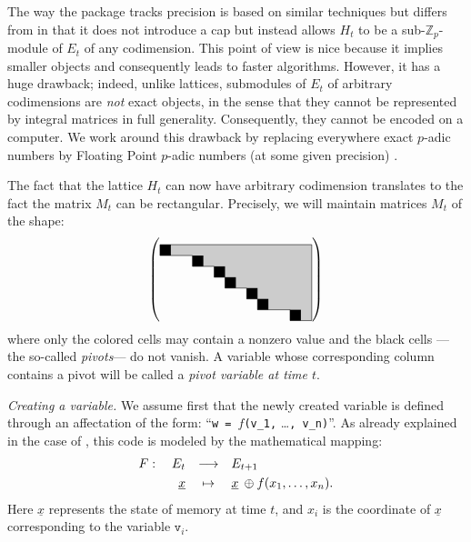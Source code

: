 \documentclass[sigconf]{acmart}
\newcommand{\Z}{\mathbb Z}
\newcommand{\Zp}{\Z_p}
\newcommand{\ttv}{\texttt{v}\xspace}
\newcommand{\ZpLC}{\text{\color{output} \rm \tt ZpLC}\xspace}
\newcommand{\ZpLF}{\text{\color{output} \rm \tt ZpLF}\xspace}
\theoremstyle{definition}
\begin{document}
The way the package \ZpLF tracks precision is based on similar 
techniques but differs from \ZpLC in that it does not introduce a cap 
but instead allows $H_t$ to be a sub-$\Zp$-module of $E_t$ of any 
codimension.
This point of view is nice because it implies smaller objects and 
consequently leads to faster algorithms. However, it has a huge 
drawback; indeed, unlike lattices, submodules of $E_t$ of arbitrary 
codimensions are \emph{not} exact objects, in the sense that they cannot 
be represented by integral matrices in full generality. Consequently,
they cannot be encoded on a computer.
We work around this drawback by replacing everywhere exact $p$-adic 
numbers by Floating Point $p$-adic numbers (at some given precision) 
\cite{}.

The fact that the lattice $H_t$ can now have arbitrary codimension
translates to the fact the matrix $M_t$ can be rectangular.
Precisely, we will maintain matrices $M_t$ of the shape:
\begin{equation}
\label{eq:shapeM-ZpLF}
\left(\raisebox{-0.5\height}{\begin{tikzpicture}[scale=0.3]
\fill[black!20] (0,0)--(0,-1)--(3,-1)--(3,-2)--(5,-2)--(5,-3)
    --(6,-3)--(6,-4)--(8,-4)--(8,-5)--(9,-5)--(9,-6)--(12,-6)
    --(12,-7)--(14,-7)--(14,0)--cycle;
\draw (0,0)--(0,-1)--(3,-1)--(3,-2)--(5,-2)--(5,-3)
    --(6,-3)--(6,-4)--(8,-4)--(8,-5)--(9,-5)--(9,-6)--(12,-6)
    --(12,-7)--(14,-7);
\fill (0,0) rectangle (1,-1);
\fill (3,-1) rectangle (4,-2);
\fill (5,-2) rectangle (6,-3);
\fill (6,-3) rectangle (7,-4);
\fill (8,-4) rectangle (9,-5);
\fill (9,-5) rectangle (10,-6);
\fill (12,-6) rectangle (13,-7);
\draw[thin] (14,-7)--(14,0)--(0,0);
\end{tikzpicture}}\right)
\end{equation}
where only the colored cells may contain a nonzero value and the 
black cells ---the so-called \emph{pivots}--- do not vanish. A
variable whose corresponding column contains a pivot will be called 
a \emph{pivot variable at time $t$}.


\medskip

\noindent \textit{Creating a variable.}
%
We assume first that the newly created variable is defined through an
affectation of the form:
``\verb?w = ?$f$\verb?(v_1,? \ldots\verb?, v_n)?''.
As already explained in the case of \ZpLC, this code is 
modeled by the mathematical mapping:
$$\begin{array}{rcl}
F: \quad E_t & \longrightarrow & E_{t+1} \smallskip \\
\underline x & \mapsto & \underline x \:\oplus f(x_1, \ldots, x_n).
\end{array}$$
Here $\underline x$ represents the state of memory at time $t$, 
and $x_i$ is the coordinate of $\underline x$ corresponding to the
variable $\ttv_i$.
\end{document}
